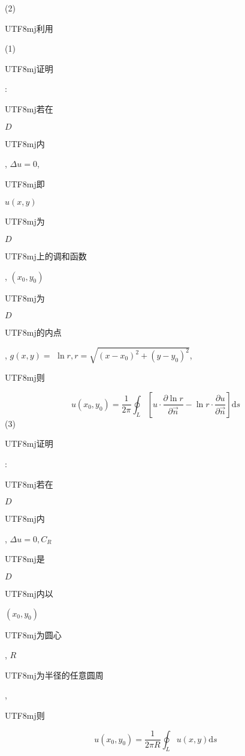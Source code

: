 \documentclass[10pt]{article}
\begin{document}
(2) \begin{CJK}{UTF8}{mj}利用\end{CJK} (1) \begin{CJK}{UTF8}{mj}证明\end{CJK}: \begin{CJK}{UTF8}{mj}若在\end{CJK} $D$ \begin{CJK}{UTF8}{mj}内\end{CJK}, $\Delta u=0$, \begin{CJK}{UTF8}{mj}即\end{CJK} $u(x, y)$ \begin{CJK}{UTF8}{mj}为\end{CJK} $D$ \begin{CJK}{UTF8}{mj}上的调和函数\end{CJK}, $\left(x_{0}, y_{0}\right)$ \begin{CJK}{UTF8}{mj}为\end{CJK} $D$ \begin{CJK}{UTF8}{mj}的内点\end{CJK}, $g(x, y)=$ $\ln r, r=\sqrt{\left(x-x_{0}\right)^{2}+\left(y-y_{0}\right)^{2}}$, \begin{CJK}{UTF8}{mj}则\end{CJK}
$$
u\left(x_{0}, y_{0}\right)=\frac{1}{2 \pi} \oint_{L}\left[u \cdot \frac{\partial \ln r}{\partial \vec{n}}-\ln r \cdot \frac{\partial u}{\partial \vec{n}}\right] \mathrm{d} s
$$
(3) \begin{CJK}{UTF8}{mj}证明\end{CJK}: \begin{CJK}{UTF8}{mj}若在\end{CJK} $D$ \begin{CJK}{UTF8}{mj}内\end{CJK}, $\Delta u=0, C_{R}$ \begin{CJK}{UTF8}{mj}是\end{CJK} $D$ \begin{CJK}{UTF8}{mj}内以\end{CJK} $\left(x_{0}, y_{0}\right)$ \begin{CJK}{UTF8}{mj}为圆心\end{CJK}, $R$ \begin{CJK}{UTF8}{mj}为半径的任意圆周\end{CJK}, \begin{CJK}{UTF8}{mj}则\end{CJK}
$$
u\left(x_{0}, y_{0}\right)=\frac{1}{2 \pi R} \oint_{L} u(x, y) \mathrm{d} s
$$
\end{document}
